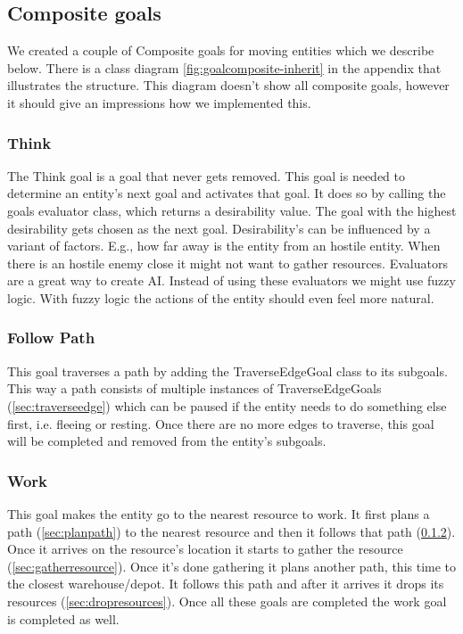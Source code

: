 \subsection{Composite goals}
We created a couple of Composite goals for moving entities which we describe below. There is a class diagram \cref{fig:goalcomposite-inherit} in the appendix that illustrates the structure. This diagram doesn't show all composite goals, however it should give an impressions how we implemented this. 

\subsubsection{Think}
The Think goal is a goal that never gets removed. This goal is needed 
to determine an entity's next goal and activates that goal. It does so by 
calling the goals evaluator class, which returns a desirability value. The 
goal with the highest desirability gets chosen as the next goal. Desirability’s can be influenced by a variant of factors. E.g., how far away is the entity from an hostile entity. When there is an hostile enemy close it might not want to gather resources. Evaluators are a great way to create AI. Instead of using these evaluators we might use fuzzy logic. With fuzzy logic the actions of the entity should even feel more natural. 

\subsubsection{Follow Path}
\label{sec:followpath}
This goal traverses a path by adding the TraverseEdgeGoal class to its 
subgoals. This way a path consists of multiple instances of TraverseEdgeGoals
(\cref{sec:traverseedge}) which can be paused if the entity needs to do 
something else first, i.e. fleeing or resting. Once there are no more edges 
to traverse, this goal will be completed and removed from the entity's 
subgoals.

\subsubsection{Work}
This goal makes the entity go to the nearest resource to work. It first plans 
a path (\cref{sec:planpath}) to the nearest resource and then it follows that 
path (\cref{sec:followpath}). Once it arrives on the resource's location it 
starts to gather the resource (\cref{sec:gatherresource}). Once it's done 
gathering it plans another path, this time to the closest warehouse/depot. It follows 
this path and after it arrives it drops its resources 
(\cref{sec:dropresources}). Once all these goals are completed the work goal is completed as well.


